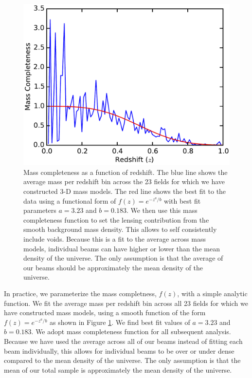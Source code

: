 \documentclass{emulateapj}
\begin{document}
\begin{figure}[t]
\begin{center}
\includegraphics[width=\columnwidth]{mass_completeness.pdf}
\caption{\label{fig:mass_complete} Mass completeness as a function of redshift. The blue line shows the average mass per redshift bin across the 23 fields for which we have constructed 3-D mass models. The red line shows the best fit to the data using a functional form of $f(z) = e^{-z^a / b}$ with best fit parameters $a = 3.23$ and $b = 0.183$. We then use this mass completeness function to set the lensing contribution from the smooth background mass density. This allows to self consistently include voids. Because this is a fit to the average across mass models, individual beams can have higher or lower than the mean density of the universe. The only assumption is that the average of our beams should be approximately the mean density of the universe.
}
\end{center}
\end{figure}

In practice, we parameterize the mass completness, $f(z)$, with a simple analytic function. We fit the average mass per redshift bin across all 23 fields for which we have constructed mass models, using a smooth function of the form $f(z) = e^{-z^a / b}$ as shown in Figure \ref{fig:mass_complete}. We find best fit values of $a = 3.23$ and $b = 0.183$. We adopt mass completeness function for all subsequent analysis. Because we have used the average across all of our beams instead of fitting each beam individually, this allows for individual beams to be over or under dense compared to the mean density of the universe. The only assumption is that the mean of our total sample is approximately the mean density of the universe. 
\end{document}
